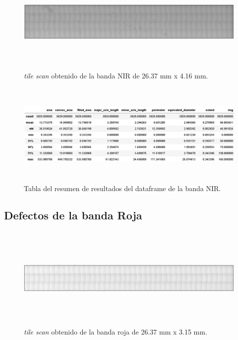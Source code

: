 \begin{figure}[H]
	\centering
	\includegraphics[width=1.0\textwidth,height= 5.0cm]{Figs/resultados_defectos/banda_nir.png}
	\caption{\textit{tile scan} obtenido de la banda NIR de 26.37 mm x 4.16 mm.}
	\label{fig:bgcel}
\end{figure}


\begin{figure}[H]
	\centering
	\includegraphics[width=1.0\textwidth,height= 5.0cm]{Figs/resultados_defectos/tabla_nir.png}
	\caption{Tabla del resumen de resultados del dataframe de la banda NIR.}
	\label{fig:bgcel}
\end{figure}

\singlespacing
\subsection{Defectos de la banda Roja}


\begin{figure}[H]
	\centering
	\includegraphics[width=1.0\textwidth,height= 5.0cm]{Figs/resultados_defectos/banda_roja.png}
	\caption{\textit{tile scan} obtenido de la banda roja de 26.37 mm x 3.15 mm.}
	\label{fig:bgcel}
\end{figure}


